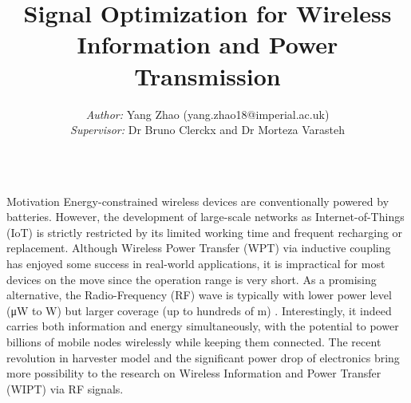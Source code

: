 \documentclass[xcolor={table}]{beamer}
\title{Signal Optimization for Wireless Information and Power Transmission}
\author{\textit{Author:} Yang Zhao (yang.zhao18@imperial.ac.uk) \\
        \textit{Supervisor:} Dr Bruno Clerckx and Dr Morteza Varasteh}
\begin{document}
\begin{frame}[fragile=singleslide,t]\centering

\maketitle

\begin{columns}[onlytextwidth,T]

\begin{column}{.47\textwidth}

\begin{block}{Motivation}
Energy-constrained wireless devices are conventionally powered by batteries. However, the development of large-scale networks as Internet-of-Things (IoT) is strictly restricted by its limited working time and frequent recharging or replacement. Although Wireless Power Transfer (WPT) via inductive coupling has enjoyed some success in real-world applications, it is impractical for most devices on the move since the operation range is very short. As a promising alternative, the Radio-Frequency (RF) wave is typically with lower power level (\si{\uW} to \si{W}) but larger coverage (up to hundreds of \si{m}) \citep{Ng2019}. Interestingly, it indeed carries both information and energy simultaneously, with the potential to power billions of mobile nodes wirelessly while keeping them connected. The recent revolution in harvester model and the significant power drop of electronics bring more possibility to the research on Wireless Information and Power Transfer (WIPT) via RF signals.
\end{block}

%
%
%


\end{column}
\end{columns}
\end{frame}
\end{document}
